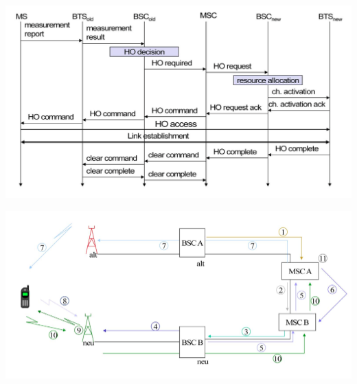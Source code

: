 \begin{minipage}{0.5 \linewidth}
\includegraphics[width = \linewidth]{./Pics/GSMInterMSCHO}
\end{minipage}
\begin{minipage}{0.5 \linewidth}
\includegraphics[width = \linewidth]{./Pics/GSMInterMSCHO2}
\end{minipage}

